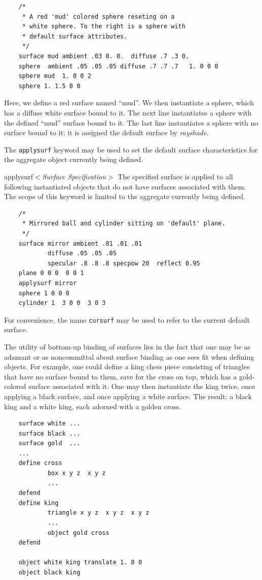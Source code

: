 \begin{verbatim}
    /*
     * A red 'mud' colored sphere reseting on a
     * white sphere. To the right is a sphere with
     * default surface attributes.
     */
    surface mud ambient .03 0. 0.  diffuse .7 .3 0.
    sphere  ambient .05 .05 .05 diffuse .7 .7 .7   1. 0 0 0
    sphere mud  1. 0 0 2
    sphere 1. 1.5 0 0
\end{verbatim}

Here, we define a red surface named ``mud''.  We then instantiate
a sphere, which has a diffuse white surface bound to it.  The
next line instantiates a sphere with the defined ``mud'' surface bound
to it.  The last line instantiates a sphere with no surface bound to it;
it is assigned the default surface by {\em rayshade}.

The {\tt applysurf} keyword may be used to set the default surface
characteristics for the aggregate object currently being defined.

\begin{defkey}{applysurf}{$<${\em Surface Specification}$>$}
The specified surface is applied to all following
instantiated objects that do not have surfaces associated with them.
The scope of this keyword is limited to the aggregate currently
being defined.
\end{defkey}

\begin{verbatim}
    /*
     * Mirrored ball and cylinder sitting on 'default' plane.
     */
    surface mirror ambient .01 .01 .01
            diffuse .05 .05 .05
            specular .8 .8 .8 specpow 20  reflect 0.95
    plane 0 0 0  0 0 1
    applysurf mirror
    sphere 1 0 0 0
    cylinder 1  3 0 0  3 0 3
\end{verbatim}

For convenience, the name {\tt cursurf} may be used to refer to the
current default surface.

The utility of bottom-up binding of surfaces lies in the fact that
one may be as adamant or as noncommittal about
surface binding as one sees fit when defining objects.  For example,
one could define a king chess piece consisting of triangles that have no
surface bound to them, save for the cross on top, which has
a gold-colored surface associated with it.  One may then instantiate
the king twice, once applying a black surface, and once applying
a white surface.  The result:  a black king and a white king, each
adorned with a golden cross.

\begin{verbatim}
    surface white ...
    surface black ...
    surface gold  ...
    ...
    define cross
            box x y z  x y z
            ...
    defend
    define king
            triangle x y z  x y z  x y z
            ...
            object gold cross
    defend

    object white king translate 1. 0 0
    object black king
\end{verbatim}
